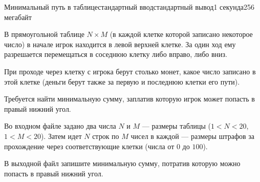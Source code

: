 \begin{problem}{Минимальный путь в таблице}{стандартный ввод}{стандартный вывод}{1 секунда}{256 мегабайт}

В прямоугольной таблице $N \times M$ (в каждой клетке которой 
записано некоторое
число) в начале игрок находится в левой верхней клетке. 
За один ход ему
разрешается перемещаться в соседнюю клетку либо вправо, 
либо вниз.

При проходе через клетку с
игрока берут столько монет, какое число записано в 
этой клетке (деньги
берут также за первую и последнюю клетки его пути).

Требуется найти минимальную сумму, заплатив которую 
игрок может попасть в правый нижний угол.


\InputFile
Во входном файле задано два числа $N$ и $M$ --- размеры таблицы 
($1 < N < 20$, $1 < M < 20$). 
Затем идет $N$ строк по $M$ чисел в каждой ---
размеры штрафов за прохождение через 
соответствующие клетки (числа от $0$ до $100$).


\OutputFile
В выходной файл запишите минимальную сумму, 
потратив которую можно попасть в правый нижний угол.

\Example

\begin{example}
%
\end{example}

\end{problem}

